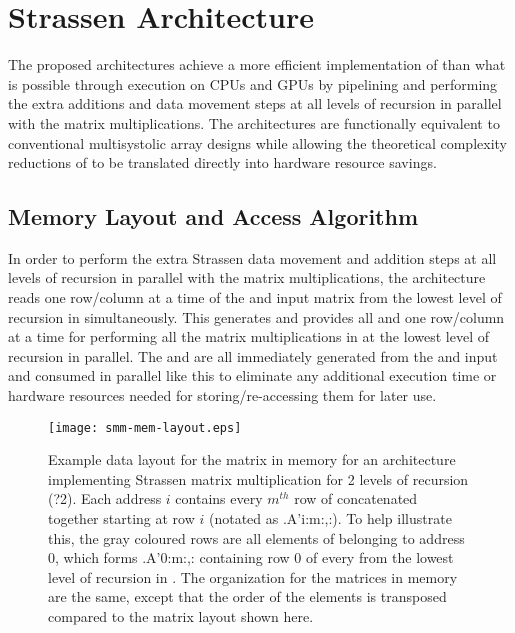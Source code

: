 \section{Strassen Architecture}
\label{smm:sec:arch}
The proposed architectures achieve a more efficient implementation of \sa than what is possible through execution on CPUs and GPUs by pipelining and performing the extra additions and data movement steps at all levels of recursion in parallel with the matrix multiplications.
The architectures are functionally equivalent to conventional multisystolic array designs while allowing the theoretical complexity reductions of \sa to be translated directly into hardware resource savings.

\subsection{Memory Layout and Access Algorithm}
\label{smm:sec:mem-layout}

In order to perform the extra Strassen data movement and addition steps at all levels of recursion in parallel with the matrix multiplications, the architecture reads one row/column at a time of the \A and \B input matrix \subblocks from the lowest level of recursion in  simultaneously.
This generates and provides all \T and \Ss \subblocks one row/column at a time for performing all the matrix multiplications in  at the lowest level of recursion in parallel.
The \T and \Ss \subblocks are all immediately generated from the \A and \B input \subblocks and consumed in parallel like this to eliminate any additional execution time or hardware resources needed for storing/re-accessing them for later use.

\begin{figure}
  \centering
  \texttt{[image: smm-mem-layout.eps]}
  \caption{Example data layout for the \A matrix in memory for an architecture implementing Strassen matrix multiplication for 2 levels of recursion  (\smmArch?2).
    Each address $i$ contains every $m^{th}$ row of \A concatenated together starting at row $i$ (notated as \m.A'{i:m:,:}).
    To help illustrate this, the gray coloured rows are all elements of \A belonging to address 0, which forms \m.A'{0:m:,:} containing row 0 of every \A \subblock from the lowest level of recursion in .
    The organization for the \B matrices in memory are the same, except that the order of the elements is transposed compared to the \A matrix layout shown here.}
  \label{smm:fig:mem}
\end{figure}

